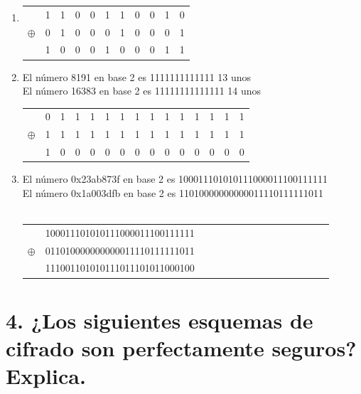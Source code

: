 \documentclass[11pt]{article}
\begin{document}
\begin{enumerate}[label=\alph*)]
    \item 
     
        \begin{tabular}{ccccccccccc}
       & 1 & 1 & 0 & 0 & 1 & 1 & 0 & 0 & 1 & 0 \\
$\oplus$ & 0 & 1 & 0 & 0 & 0 & 1 & 0 & 0 & 0 & 1  \\
\hline
       & 1 & 0 & 0 & 0 & 1 & 0 & 0 & 0 & 1 & 1  \\
\end{tabular}
        \item
        El número 8191 en base 2 es 1111111111111  13 unos\\
        El número 16383 en base 2 es 11111111111111 14 unos\\
      
        
         \begin{tabular}{ccccccccccccccc}
        & 0 & 1 &1 & 1 & 1 & 1 & 1 & 1 & 1 & 1 & 1 & 1 & 1 & 1 \\
$\oplus$  & 1 & 1 &1 & 1 & 1 & 1 & 1 & 1 & 1 & 1 & 1 & 1 & 1 & 1  \\
\hline
        & 1 & 0 &0 & 0 & 0 & 0 & 0 & 0 & 0 & 0 & 0 & 0 & 0 & 0  \\
\end{tabular}
          \item 
        El número 0x23ab873f en base 2 es 100011101010111000011100111111\\
        El número 0x1a003dfb en base 2 es 11010000000000011110111111011\\\\
       \begin{tabular}{ccccccccccccccc}
        & 100011101010111000011100111111 \\
$\oplus$  & 011010000000000011110111111011  \\
\hline
        & 111001101010111011101011000100  \\
\end{tabular}
\end{enumerate}
        
    \section*{4. ¿Los siguientes esquemas de cifrado son perfectamente seguros? Explica.}
    
\end{document}
